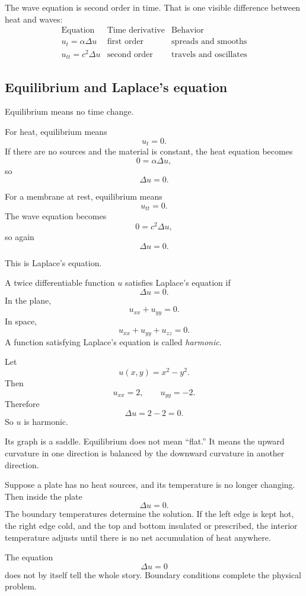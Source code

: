 The wave equation is second order in time.  That is one visible difference between heat
and waves:
\[
\begin{array}{c|c|c}
\text{Equation} & \text{Time derivative} & \text{Behavior} \\ \hline
u_t=\alpha\Delta u & \text{first order} & \text{spreads and smooths}\\[1mm]
u_{tt}=c^2\Delta u & \text{second order} & \text{travels and oscillates}
\end{array}
\]

\subsection{Equilibrium and Laplace's equation}

Equilibrium means no time change.

For heat, equilibrium means
\[
    u_t=0.
\]
If there are no sources and the material is constant, the heat equation becomes
\[
    0=\alpha\Delta u,
\]
so
\[
\boxed{
    \Delta u=0.
}
\]

For a membrane at rest, equilibrium means
\[
    u_{tt}=0.
\]
The wave equation becomes
\[
    0=c^2\Delta u,
\]
so again
\[
\boxed{
    \Delta u=0.
}
\]

This is Laplace's equation.

\begin{definition}
A twice differentiable function \(u\) satisfies Laplace's equation if
\[
\boxed{
    \Delta u=0.
}
\]
In the plane,
\[
\boxed{
    u_{xx}+u_{yy}=0.
}
\]
In space,
\[
\boxed{
    u_{xx}+u_{yy}+u_{zz}=0.
}
\]
A function satisfying Laplace's equation is called \emph{harmonic}.
\end{definition}

\begin{example}
Let
\[
    u(x,y)=x^2-y^2.
\]
Then
\[
    u_{xx}=2,
    \qquad
    u_{yy}=-2.
\]
Therefore
\[
    \Delta u=2-2=0.
\]
So \(u\) is harmonic.

Its graph is a saddle.  Equilibrium does not mean ``flat.''  It means the upward
curvature in one direction is balanced by the downward curvature in another direction.
\end{example}

\begin{example}
Suppose a plate has no heat sources, and its temperature is no longer changing.  Then
inside the plate
\[
    \Delta u=0.
\]
The boundary temperatures determine the solution.  If the left edge is kept hot, the
right edge cold, and the top and bottom insulated or prescribed, the interior
temperature adjusts until there is no net accumulation of heat anywhere.

The equation
\[
    \Delta u=0
\]
does not by itself tell the whole story.  Boundary conditions complete the physical
problem.
\end{example}

